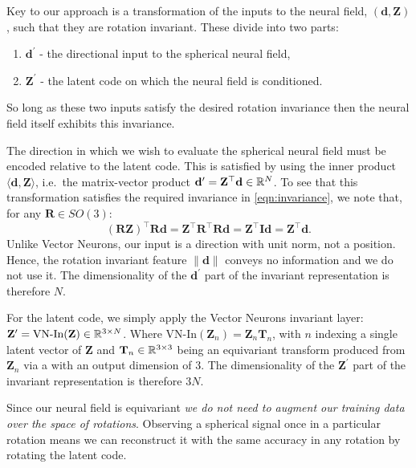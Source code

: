 Key to our approach is a transformation of the inputs to the neural field, $(\mathbf{d},\mathbf{Z})$, such that they are rotation invariant. These divide into two parts:
\begin{enumerate}
    \item $\mathbf{d}^\prime$ - the directional input to the spherical neural field,
    \item $\mathbf{Z}^\prime$ - the latent code on which the neural field is conditioned.
\end{enumerate}

So long as these two inputs satisfy the desired rotation invariance then the neural field itself exhibits this invariance.

The direction in which we wish to evaluate the spherical neural field must be encoded relative to the latent code. 
This is satisfied by using the inner product $\langle \mathbf{d},\mathbf{Z} \rangle$, i.e.~the matrix-vector product $\mathbf{d}^\prime=\mathbf{Z}^\top\mathbf{d}\in{\mathbb{R}}^N$. 
To see that this transformation satisfies the required invariance in \eqref{eqn:invariance}, we note that, for any $\mathbf{R}\in SO(3)$: 
\begin{equation}
(\mathbf{RZ})^\top\mathbf{Rd}=\mathbf{Z}^\top\mathbf{R}^\top\mathbf{Rd}=\mathbf{Z}^\top\mathbf{I}\mathbf{d}=\mathbf{Z}^\top\mathbf{d}.\label{eqn:invar}
\end{equation}
Unlike Vector Neurons, our input is a direction with unit norm, not a position. Hence, the rotation invariant feature $\|\mathbf{d}\|$ conveys no information and we do not use it. The dimensionality of the $\mathbf{d}^\prime$ part of the invariant representation is therefore $N$.

For the latent code, we simply apply the Vector Neurons \cite{deng_vector_2021} invariant layer: $\mathbf{Z}^\prime=\text{VN-In}(\mathbf{Z}) \in {\mathbb{R}}^{3 \times N}$. Where $\text{VN-In}(\mathbf{Z}_{n}) = \mathbf{Z}_{n}\mathbf{T}_{n}$, with $n$ indexing a single latent vector of $\mathbf{Z}$ and $\mathbf{T}_{n} \in {\mathbb{R}}^{3 \times 3}$ being an equivariant transform produced from $\mathbf{Z}_{n}$ via a  with an output dimension of $3$. The dimensionality of the $\mathbf{Z}^\prime$ part of the invariant representation is therefore $3N$.

Since our neural field is equivariant \emph{we do not need to augment our training data over the space of rotations}. Observing a spherical signal once in a particular rotation means we can reconstruct it with the same accuracy in any rotation by rotating the latent code.


